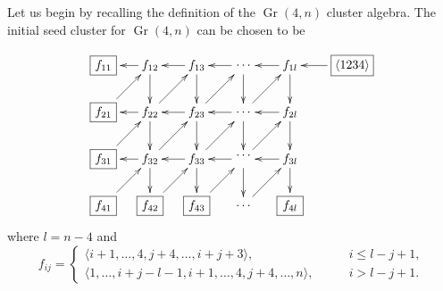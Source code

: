 \documentclass[11pt]{article}
\DeclareMathOperator{\Gr}{Gr}
\def\ket#1{\langle #1 \rangle}
\begin{document}
Let us begin by recalling the definition of the $\Gr(4,n)$ cluster algebra. The initial seed cluster for $\Gr(4,n)$ can be chosen to be~\cite{1088.22009}

\begin{equation}\label{eq:g4n-seed}
\begin{gathered}
\begin{xy} 0;<-.5pt,0pt>:<0pt,-.5pt>::
	 (-100,0) *+{\framebox[8ex]{$\ket{1234}$}} ="-1",
         (300,75) *+{\framebox[5ex]{$f_{21}$}} ="9",
	 (225,75) *+{f_{22}} ="8",
	 (150,75) *+{f_{23}} ="7",
	 (75,75) *+{\color{white} f_{00}} ="6",
	 (0,75) *+{f_{2l}} ="5",
	 (300,0) *+{\framebox[5ex]{$f_{11}$}} ="4",
	 (225,0) *+{f_{12}} ="3",
	 (150,0) *+{f_{13}} ="2",
	 (0,0) *+{f_{1l}} ="0",
	 (75,0) *+{\color{white} f_{00}} ="1",
	 (300,150) *+{\framebox[5ex]{$f_{31}$}} ="14",
	 (225,150) *+{f_{32}} ="13",
	 (150,150) *+{f_{33}} ="12",
	 (75,150) *+{\color{white} f_{00}} ="11",
	 (0,150) *+{f_{3l}} ="10",
	 (0,225) *+{\framebox[5ex]{$f_{4l}$}} ="15",
	 (75,225) *+{\color{white} f_{00}} ="16",
	 (75,0) *+{\cdots} ="01",
	 (75,75) *+{\cdots} ="06",
	 (75,144) *+{\cdots} ="011",
	 (75,225) *+{\cdots} ="016",
	 (150,225) *+{\framebox[5ex]{$f_{43}$}} ="17",
	 (225,225) *+{\framebox[5ex]{$f_{42}$}} ="18",
	 (300,225) *+{\framebox[5ex]{$f_{41}$}} ="19",
	 	"0", {\ar"1"},
		"-1", {\ar"0"},
		"0", {\ar"5"},
		"1", {\ar"2"},
		"6", {\ar"0"},
		"2", {\ar"3"},
		"8", {\ar"2"},
		"2", {\ar"7"},
		"3", {\ar"4"},
		"9", {\ar"3"},
		"3", {\ar"8"},
		"5", {\ar"6"},
		"7", {\ar"8"},
		"6", {\ar"7"},
		"8", {\ar"9"},
		"7", {\ar"12"},
		"13", {\ar"7"},
		"8", {\ar"13"},
		"14", {\ar"8"},
		"5", {\ar"10"},
		"10", {\ar"15"},
		"19", {\ar"13"},
		"12", {\ar"17"},
		"18", {\ar"12"},
		"17", {\ar"11"},
		"13", {\ar"18"},
		"16", {\ar"10"},
		"12", {\ar"13"},
		"13", {\ar"14"},
		"11", {\ar"12"},
		"7", {\ar"1"},
		"10", {\ar"11"},
		"11", {\ar"5"},
		"1", {\ar"6"},
		"12", {\ar"6"},
		"6", {\ar"11"},
		"11", {\ar"16"},
\end{xy}
\end{gathered} 
\end{equation}
where $l=n-4$ and 
\begin{equation}
  f_{i j} =
  \begin{cases}
    \langle i+1, \dotsc, 4, j + 4, \dotsc, i+j+3\rangle, \qquad &i \leq l-j+1,\\
    \langle 1, \dotsc, i+j-l-1, i+1, \dotsc, 4, j+4, \dotsc, n\rangle, \qquad &i >l-j+1.
  \end{cases}
\end{equation}
\end{document}
